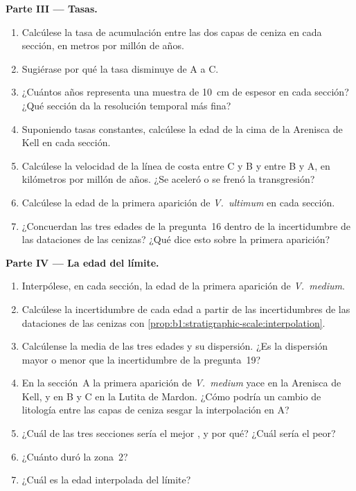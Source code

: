 \begin{problem}
\noindent\textbf{Parte III --- Tasas.}
\begin{enumerate}[resume]
  \item Calcúlese la tasa de acumulación entre las dos capas de ceniza en cada sección, en metros por millón de años.
  \item Sugiérase por qué la tasa disminuye de A a C.
  \item ¿Cuántos años representa una muestra de \qty{10}{cm} de espesor en cada sección? ¿Qué sección da la resolución temporal más fina?
  \item Suponiendo tasas constantes, calcúlese la edad de la cima de la Arenisca de Kell en cada sección.
  \item Calcúlese la velocidad de la línea de costa entre C y B y entre B y A, en kilómetros por millón de años. ¿Se aceleró o se frenó la transgresión?
  \item Calcúlese la edad de la primera aparición de \emph{V.~ultimum} en cada sección.
  \item ¿Concuerdan las tres edades de la pregunta~16 dentro de la incertidumbre de las dataciones de las cenizas? ¿Qué dice esto sobre la primera aparición?
\end{enumerate}

\noindent\textbf{Parte IV --- La edad del límite.}
\begin{enumerate}[resume]
  \item Interpólese, en cada sección, la edad de la primera aparición de \emph{V.~medium}.
  \item Calcúlese la incertidumbre de cada edad a partir de las incertidumbres de las dataciones de las cenizas con \cref{prop:b1:stratigraphic-scale:interpolation}.
  \item Calcúlense la media de las tres edades y su dispersión. ¿Es la dispersión mayor o menor que la incertidumbre de la pregunta~19?
  \item En la sección~A la primera aparición de \emph{V.~medium} yace en la Arenisca de Kell, y en B y C en la Lutita de Mardon. ¿Cómo podría un cambio de litología entre las capas de ceniza sesgar la interpolación en A?
  \item ¿Cuál de las tres secciones sería el mejor , y por qué? ¿Cuál sería el peor?
  \item ¿Cuánto duró la zona~2?
  \item ¿Cuál es la edad interpolada del límite?
\end{enumerate}
\end{problem}
